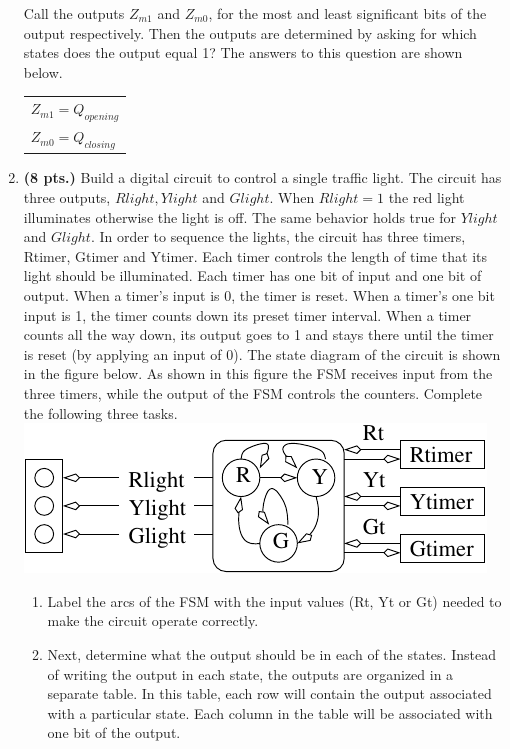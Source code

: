 \begin{enumerate}
\begin{solution}
{Call the outputs $Z_{m1}$ and $Z_{m0}$, for the most and least
significant bits of the output respectively.  Then the outputs
are determined by asking for which states does the output
equal 1?  The answers to this question are shown below.

\begin{tabular}{l}
$Z_{m1} = Q_{opening}$ \\
$Z_{m0} = Q_{closing}$ \\
\end{tabular}

}\end{solution}


\item {\bf (8 pts.)}
Build a digital circuit to control a single traffic light.  The circuit
has three outputs, $Rlight, Ylight$ and $ Glight$.  When
$Rlight=1$ the red light illuminates otherwise the light is off.
The same behavior holds true for $Ylight$ and $Glight$.  In order
to sequence the lights, the circuit has three timers, Rtimer, Gtimer and 
Ytimer.  Each timer controls the length of time that its light should be 
illuminated.  Each timer has one bit of input and one bit of output.  When a 
timer's input is 0, the timer is reset.  When a timer's one bit
input is 1, the timer 
counts down its preset timer interval.  When a timer counts all the way down,
its output goes to 1 and stays there until the timer is reset (by applying
an input of 0).  The state diagram of the circuit is shown in the
figure below.  As shown in this figure the FSM receives input from the 
three timers, while the output of the FSM controls the counters. Complete
the following three tasks.
\includegraphics{./FigWork/Light}

\begin{enumerate}
\item Label the arcs of the FSM with the input values (Rt, Yt or Gt)
needed to make the circuit operate correctly.  

\item Next, determine what the output should be in each
of the states.  Instead of writing the output in each state, the
outputs are organized in a separate table.  In this table, each
row will contain the output associated with a particular state.
Each column in the table will be associated with one bit of the output.


\end{enumerate}
\end{enumerate}
